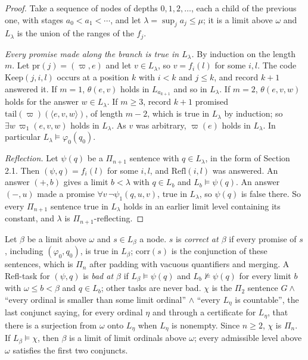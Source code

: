 \documentclass[11pt]{article}
\begin{document}
\begin{proof}
Take a sequence of nodes of depths $0, 1, 2, \dots$, each a child of the previous one, with stages $a_0 < a_1 <
\cdots$, and let $\lambda = \sup_j a_j \le \mu$; it is a limit above $\omega$ and $L_\lambda$ is the union of the
ranges of the $f_j$.

\emph{Every promise made along the branch is true in $L_\lambda$.} By induction on the length $m$. Let $\mathrm{pr}(j)
= (\varpi, e)$ and let $v \in L_\lambda$, so $v = f_i(l)$ for some $i, l$. The code $\mathrm{Keep}(j,i,l)$ occurs at a
position $k$ with $i < k$ and $j \le k$, and record $k+1$ answered it. If $m = 1$, $\theta(e,v)$ holds in $L_{a_{k+1}}$
and so in $L_\lambda$. If $m = 2$, $\theta(e,v,w)$ holds for the answer $w \in L_\lambda$. If $m \ge 3$, record $k+1$
promised $\mathrm{tail}(\varpi)(\langle e,v,w\rangle)$, of length $m - 2$, which is true in $L_\lambda$ by induction; so
$\exists w\, \varpi_1(e,v,w)$ holds in $L_\lambda$. As $v$ was arbitrary, $\varpi(e)$ holds in $L_\lambda$. In particular
$L_\lambda \models \varphi_0(q_0)$.

\emph{Reflection.} Let $\psi(q)$ be a $\Pi_{n+1}$ sentence with $q \in L_\lambda$, in the form of Section 2.1. Then
$(\psi, q) = f_i(l)$ for some $i, l$, and $\mathrm{Refl}(i,l)$ was answered. An answer $(+, b)$ gives a limit $b <
\lambda$ with $q \in L_b$ and $L_b \models \psi(q)$. An answer $(-, u)$ made a promise $\forall v\, \neg\psi_1(q,u,v)$,
true in $L_\lambda$, so $\psi(q)$ is false there. So every $\Pi_{n+1}$ sentence true in $L_\lambda$ holds in an
earlier limit level containing its constant, and $\lambda$ is $\Pi_{n+1}$-reflecting.
\end{proof}

Let $\beta$ be a limit above $\omega$ and $s \in L_\beta$ a node. $s$ is \emph{correct at $\beta$} if every promise of
$s$, including $(\varphi_0, q_0)$, is true in $L_\beta$; $\mathrm{corr}(s)$ is the conjunction of these sentences,
which is $\Pi_n$ after padding with vacuous quantifiers and merging. A Refl-task for $(\psi,q)$ is \emph{bad at
$\beta$} if $L_\beta \models \psi(q)$ and $L_b \nvDash \psi(q)$ for every limit $b$ with $\omega \le b < \beta$ and $q
\in L_b$; other tasks are never bad. $\chi$ is the $\Pi_2$ sentence $G \wedge$ ``every ordinal is smaller than some
limit ordinal'' $\wedge$ ``every $L_\eta$ is countable'', the last conjunct saying, for every ordinal $\eta$ and through a
certificate for $L_\eta$, that there is a surjection from $\omega$ onto $L_\eta$ when $L_\eta$ is nonempty. Since $n \ge
2$, $\chi$ is $\Pi_n$. If $L_\beta \models \chi$, then $\beta$ is a limit of limit ordinals above $\omega$; every
admissible level above $\omega$ satisfies the first two conjuncts.
\end{document}
